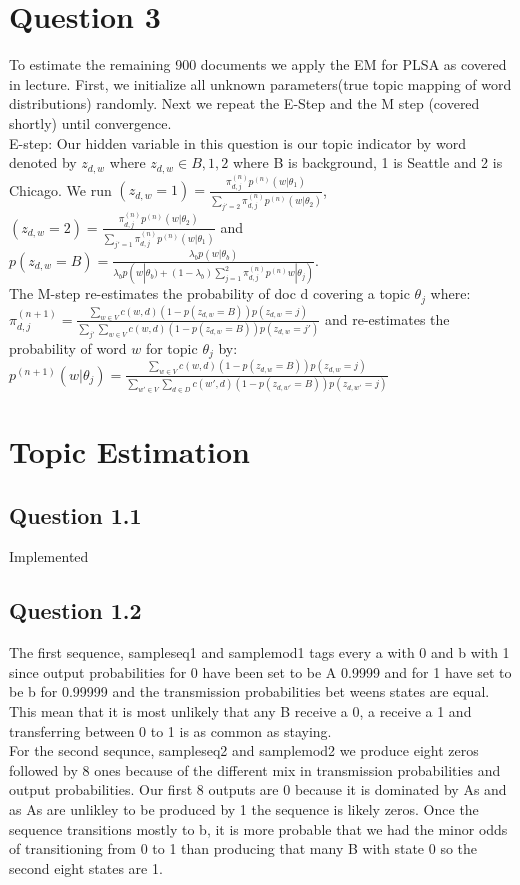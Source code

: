 \documentclass[11pt]{article}
\begin{document}
\section{Question 3}
To estimate the remaining 900 documents we apply the EM for PLSA as covered in lecture. First, we initialize all unknown parameters(true topic mapping of word distributions) randomly. Next we repeat the E-Step and the M step (covered shortly) until convergence. \\
E-step: Our hidden variable in this question is our topic indicator by word denoted by $z_{d,w}$ where $z_{d,w} \in {B, 1,2}$ where B is background, 1 is Seattle and 2 is Chicago. We run $(z_{d,w} = 1) = \frac{\pi_{d,j}^(n) p^(n) (w| \theta_1)}{\sum_{j'=2} \pi_{d,j}^(n) p^(n)(w| \theta_2)}$, $(z_{d,w} = 2) = \frac{\pi_{d,j}^(n) p^(n) (w| \theta_2)}{\sum_{j'=1} \pi_{d,j}^(n) p^(n)(w| \theta_1)}$ and $p(z_{d,w} = B) = \frac{\lambda_b p(w|\theta_b)}{\lambda_b p(w|\theta_b) + (1-\lambda_b)\sum_{j=1}^2 \pi_{d,j}^(n) p^(n) w| \theta_j)}$. \\
The M-step re-estimates the probability of doc d covering a topic $\theta_j$ where: $\pi_{d,j}^(n+1) = \frac{\sum_{w \in V} c(w,d)(1-p(z_{d,w}=B))p(z_{d,w} = j)}{\sum_{j'} \sum_{w \in V} c(w,d)(1-p(z_{d,w}=B))p(z_{d,w} = j')}$ and re-estimates the probability of word $w$ for topic $\theta_j$ by: $p^(n+1)(w| \theta_j) = \frac{\sum_{w \in V} c(w,d)(1-p(z_{d,w}=B))p(z_{d,w} = j)}{\sum_{w' \in V} \sum_{d \in D} c(w',d)(1-p(z_{d,w'}=B))p(z_{d,w'} = j)}$
\section{Topic Estimation}
\subsection{Question 1.1}
Implemented
\subsection{Question 1.2}
The first sequence, sampleseq1 and samplemod1 tags every a with 0 and b with 1 since output probabilities for 0 have been set to be A 0.9999 and for 1 have set to be b for 0.99999 and the transmission probabilities bet weens states are equal. This mean that it is most unlikely that any B receive a 0, a receive a 1 and transferring between 0 to 1 is as common as staying. \\
For the second sequnce, sampleseq2 and samplemod2 we produce eight zeros followed by 8 ones because of the different mix in transmission probabilities and output probabilities. Our first 8 outputs are 0 because it is dominated by As and as As are unlikley to be produced by 1 the sequence is likely zeros. Once the sequence transitions mostly to b, it is more probable that we had the minor odds of transitioning from 0 to 1 than producing that many B with state 0 so the second eight states are 1. 
\end{document}

